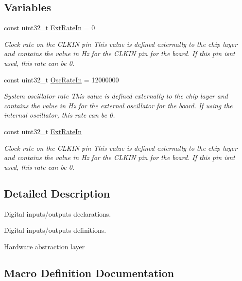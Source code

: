 \subsection*{Variables}
\begin{DoxyCompactItemize}
\item 
const uint32\+\_\+t \hyperlink{group__hal_ga74ceed751e84a920be263a7fe3da67f0}{Ext\+Rate\+In} = 0
\begin{DoxyCompactList}\small\item\em Clock rate on the C\+L\+K\+IN pin This value is defined externally to the chip layer and contains the value in Hz for the C\+L\+K\+IN pin for the board. If this pin isn\textquotesingle{}t used, this rate can be 0. \end{DoxyCompactList}\item 
const uint32\+\_\+t \hyperlink{group__hal_ga2e84f0502f9a7fdd271b97c588696e6f}{Osc\+Rate\+In} = 12000000
\begin{DoxyCompactList}\small\item\em System oscillator rate This value is defined externally to the chip layer and contains the value in Hz for the external oscillator for the board. If using the internal oscillator, this rate can be 0. \end{DoxyCompactList}\end{DoxyCompactItemize}
\begin{DoxyCompactItemize}
\item 
const uint32\+\_\+t \hyperlink{group__hal_ga74ceed751e84a920be263a7fe3da67f0}{Ext\+Rate\+In}
\begin{DoxyCompactList}\small\item\em Clock rate on the C\+L\+K\+IN pin This value is defined externally to the chip layer and contains the value in Hz for the C\+L\+K\+IN pin for the board. If this pin isn\textquotesingle{}t used, this rate can be 0. \end{DoxyCompactList}\end{DoxyCompactItemize}


\subsection{Detailed Description}
Digital inputs/outputs declarations. 

Digital inputs/outputs definitions.

Hardware abstraction layer 

\subsection{Macro Definition Documentation}
\mbox{\label{group__hal_ga7df8b8faeffb332d3a85829727f6e3f3}} 
